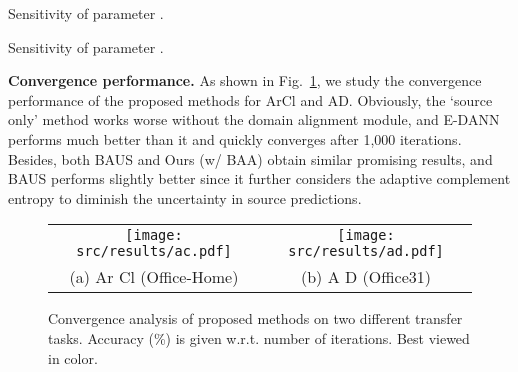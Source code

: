 \documentclass[runningheads]{llncs}
\begin{document}
	\setlength{\tabcolsep}{3.0pt}
	\begin{table}[h]
		\centering
		\begin{minipage}{0.48\linewidth}
			\centering
			\caption{Sensitivity of parameter .}
			\resizebox{0.95\textwidth}{!}{}
			\label{tab:p1}
		\end{minipage}
		\begin{minipage}{0.48\linewidth}
			\centering
			\caption{Sensitivity of parameter .}
			\resizebox{0.82\textwidth}{!}{}
			\label{tab:p2}
		\end{minipage}
	\end{table}
	
\textbf{Convergence performance.}
As shown in Fig.~\ref{fig:convergence}, we study the convergence performance of the proposed methods for ArCl and AD.
Obviously, the `source only' method works worse without the domain alignment module, and E-DANN performs much better than it and quickly converges after 1,000 iterations.
Besides, both BAUS and Ours (w/ BAA) obtain similar promising results, and BAUS performs slightly better since it further considers the adaptive complement entropy to diminish the uncertainty in source predictions.
	
	\begin{figure}[h]
		\centering
		\scriptsize
		\setlength\tabcolsep{0mm}
		\renewcommand\arraystretch{1.0}
		\begin{tabular}{cc}
			\texttt{[image: src/results/ac.pdf]} & 
			\texttt{[image: src/results/ad.pdf]}\\
			(a) Ar  Cl (Office-Home) & (b) A  D (Office31)
		\end{tabular}
		\caption{Convergence analysis of proposed methods on two different transfer tasks. Accuracy (\%) is given w.r.t. number of iterations. Best viewed in color.}
		\label{fig:convergence}
	\end{figure}
	
\end{document}
